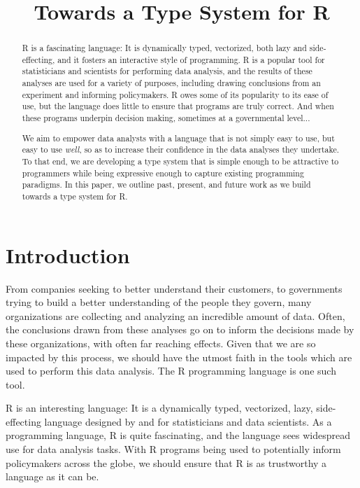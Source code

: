 \documentclass[sigplan,10pt,review,anonymous]{acmart}\settopmatter{printfolios=true,printccs=false,printacmref=false}
\begin{document}
\title{Towards a Type System for R}

\begin{abstract}

R is a fascinating language:
It is dynamically typed, vectorized, both lazy and side-effecting, and it fosters an interactive style of programming.
R is a popular tool for statisticians and scientists for performing data analysis, and the results of these analyses are used for a variety of purposes, including drawing conclusions from an experiment and informing policymakers.
R owes some of its popularity to its ease of use, but the language does little to ensure that programs are truly correct.
And when these programs underpin decision making, sometimes at a governmental level...

We aim to empower data analysts with a language that is not simply easy to use, but easy to use {\it well}, so as to increase their confidence in the data analyses they undertake.
To that end, we are developing a type system that is simple enough to be attractive to programmers while being expressive enough to capture existing programming paradigms.
In this paper, we outline past, present, and future work as we build towards a type system for R. 

\end{abstract}

\maketitle


%
%
%
%
\section{Introduction}

From companies seeking to better understand their customers, to governments trying to build a better understanding of the people they govern, many organizations are collecting and analyzing an incredible amount of data.
Often, the conclusions drawn from these analyses go on to inform the decisions made by these organizations, with often far reaching effects.
Given that we are so impacted by this process, we should have the utmost faith in the tools which are used to perform this data analysis.
The R programming language is one such tool.

R is an interesting language:
It is a dynamically typed, vectorized, lazy, side-effecting language designed by and for statisticians and data scientists.
As a programming language, R is quite fascinating, and the language sees widespread use for data analysis tasks.
With R programs being used to potentially inform policymakers across the globe, we should ensure that R is as trustworthy a language as it can be.
\end{document}
